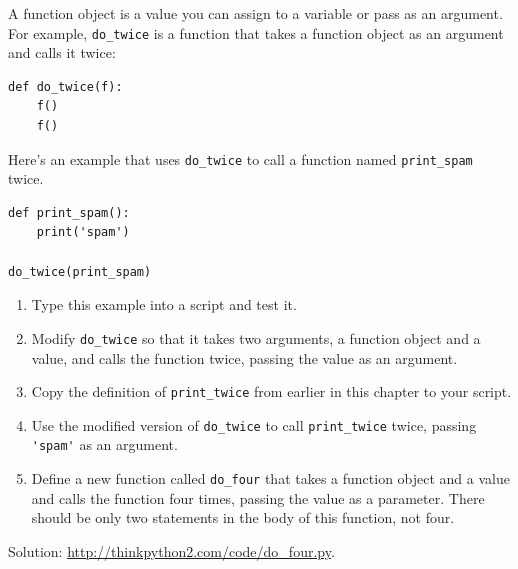 \documentclass[10pt]{book}
\begin{document}
\begin{exercise}

A function object is a value you can assign to a variable
or pass as an argument.  For example, \verb"do_twice" is a function
that takes a function object as an argument and calls it twice:

\begin{verbatim}
def do_twice(f):
    f()
    f()
\end{verbatim}

Here's an example that uses \verb"do_twice" to call a function
named \verb"print_spam" twice.

\begin{verbatim}
def print_spam():
    print('spam')

do_twice(print_spam)
\end{verbatim}

\begin{enumerate}

\item Type this example into a script and test it.

\item Modify \verb"do_twice" so that it takes two arguments, a
function object and a value, and calls the function twice,
passing the value as an argument.

\item Copy the definition of 
\verb"print_twice" from earlier in this chapter to your script.

\item Use the modified version of \verb"do_twice" to call
\verb"print_twice" twice, passing \verb"'spam'" as an argument.

\item Define a new function called 
\verb"do_four" that takes a function object and a value
and calls the function four times, passing the value
as a parameter.  There should be only
two statements in the body of this function, not four.

\end{enumerate}

Solution: \url{http://thinkpython2.com/code/do_four.py}.

\end{exercise}
\end{document}
